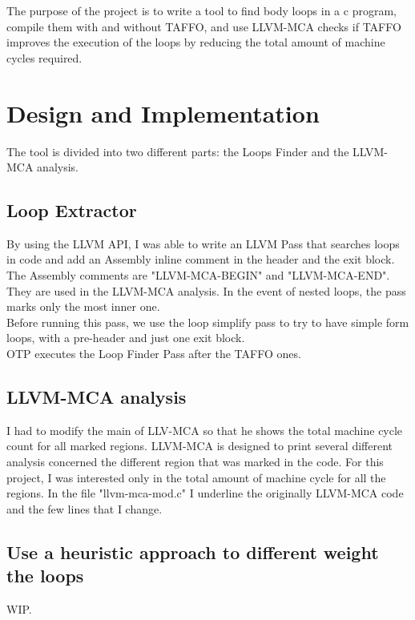 The purpose of the project is to write a tool to find body loops in a c program, compile them with and without TAFFO, and use LLVM-MCA checks if TAFFO improves the execution of the loops by reducing the total amount of machine cycles required.

\section{Design and Implementation}
The tool is divided into two different parts: the Loops Finder and the LLVM-MCA analysis.

\subsection{Loop Extractor}
By using the LLVM API, I was able to write an LLVM Pass that searches loops in code and add an Assembly inline comment in the header and the exit block.\\
The Assembly comments are "LLVM-MCA-BEGIN" and "LLVM-MCA-END". They are used in the LLVM-MCA analysis.
In the event of nested loops, the pass marks only the most inner one.\\
Before running this pass, we use the loop simplify pass to try to have simple form loops, with a pre-header and just one exit block.\\
OTP executes the Loop Finder Pass after the TAFFO ones.\\

\subsection{LLVM-MCA analysis}

I had to modify the main of LLV-MCA so that he shows the total machine cycle count for all marked regions. LLVM-MCA is designed to print several different analysis concerned the different region that was marked in the code. For this project, I was interested only in the total amount of machine cycle for all the regions.
In the file "llvm-mca-mod.c" I underline the originally LLVM-MCA code and the few lines that I change.

\subsection{Use a heuristic approach to different weight the loops}
WIP.



